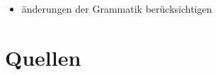 \documentclass[]{article}
\begin{document}
\begin{itemize}
  \item änderungen der Grammatik berücksichtigen
\end{itemize}




\newpage
\section{Quellen}





\end{document}
